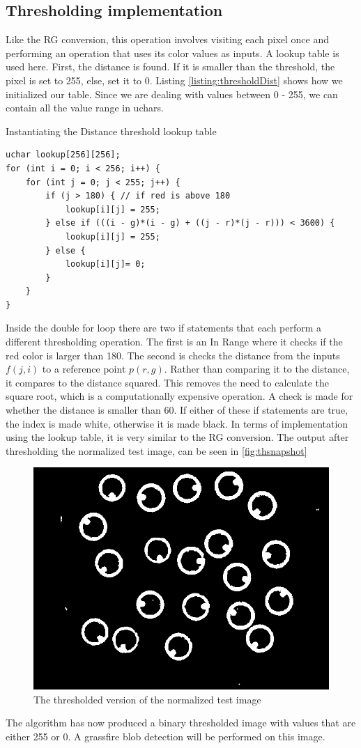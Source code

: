 {\subsection{Thresholding implementation}
Like the RG conversion, this operation involves visiting each pixel once and performing an operation that uses its color values as inputs. A lookup table is used here. First, the distance is found. If it is smaller than the threshold, the pixel is set to 255, else, set it to 0. Listing \ref{listing:thresholdDist} shows how we initialized our table. Since we are dealing with values between 0 - 255, we can contain all the value range in uchars.
\begin{listing}[H]
	\caption{Instantiating the Distance threshold lookup table}
	\label{listing:thresholdDist}
	\begin{verbatim}
uchar lookup[256][256];
for (int i = 0; i < 256; i++) {
	for (int j = 0; j < 255; j++) {
		if (j > 180) { // if red is above 180
			lookup[i][j] = 255;
		} else if (((i - g)*(i - g) + ((j - r)*(j - r))) < 3600) {
			lookup[i][j] = 255;
		} else {
			lookup[i][j]= 0;
		}
	}
}
\end{verbatim}
\end{listing}
Inside the double for loop there are two if statements that each perform a different thresholding operation. The first is an In Range where it checks if the red color is larger than 180. The second is checks the distance from the inputs $f(j,i)$ to a reference point $p(r,g)$. Rather than comparing it to the distance, it compares to the distance squared. This removes the need to calculate the square root, which is a computationally expensive operation. A check is made for whether the distance is smaller than 60. If either of these if statements are true, the index is made white, otherwise it is made black.
In terms of implementation using the lookup table, it is very similar to the RG conversion. The output after thresholding the normalized test image, can be seen in \autoref{fig:thsnapshot}\\
\begin{figure}[H]
	\centering
	\includegraphics[width=0.6\linewidth]{figure/Analysis/thresholded.png}
	\caption{The thresholded version of the normalized test image}
	\label{fig:thsnapshot}
\end{figure} 
The algorithm has now produced a binary thresholded image with values that are either 255 or 0. A grassfire blob detection will be performed on this image. 
}
